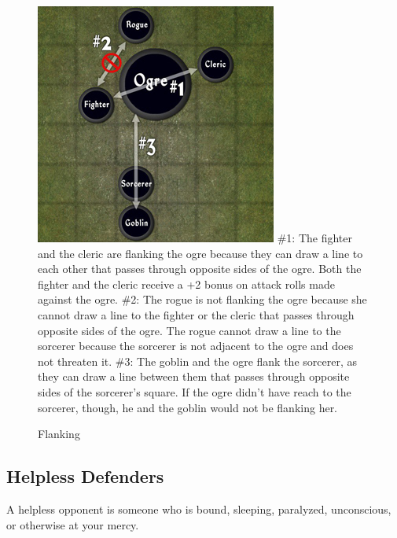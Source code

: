 \begin{figure}
\sffamily
\caption{Flanking}
\includegraphics[width=\linewidth]{images/Flanking.jpg}
\#1: The fighter and the cleric are flanking the ogre because they can draw a line to each other that passes through opposite sides of the ogre. Both the fighter and the cleric receive a +2 bonus on attack rolls made against the ogre.\newline
\#2: The rogue is not flanking the ogre because she cannot draw a line to the fighter or the cleric that passes through opposite sides of the ogre. The rogue cannot draw a line to the sorcerer because the sorcerer is not adjacent to the ogre and does not threaten it.\newline
\#3: The goblin and the ogre flank the sorcerer, as they can draw a line between them that passes through opposite sides of the sorcerer's square. If the ogre didn't have reach to the sorcerer, though, he and the goblin would not be flanking her.
\end{figure}

\subsection{Helpless Defenders}

				
A helpless opponent is someone who is bound, sleeping, paralyzed, unconscious, or otherwise at your mercy.
				
